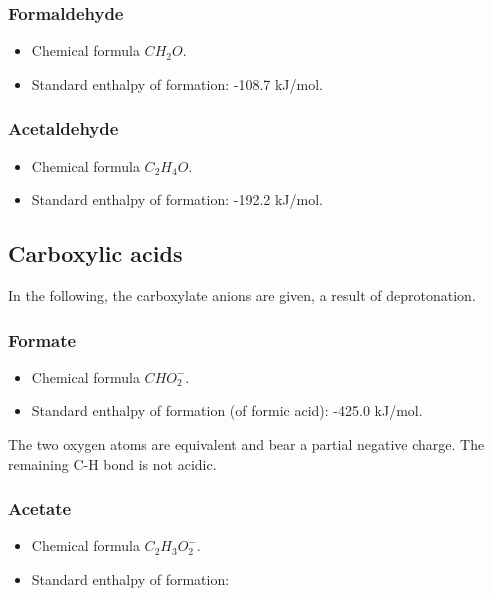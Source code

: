 \documentclass{article}
\begin{document}
\subsubsection{Formaldehyde}

\begin{itemize}
    \item Chemical formula $CH_2O$.
    \item Standard enthalpy of formation: -108.7 kJ/mol.
\end{itemize}

\subsubsection{Acetaldehyde}

\begin{itemize}
    \item Chemical formula $C_2H_4O$.
    \item Standard enthalpy of formation: -192.2 kJ/mol.
\end{itemize}

\subsection{Carboxylic acids}

In the following, the carboxylate anions are given, a result of deprotonation.

\subsubsection{Formate}
\begin{itemize}
    \item Chemical formula $CHO_2^-$.
    \item Standard enthalpy of formation (of formic acid): -425.0 kJ/mol.
\end{itemize}
The two oxygen atoms are equivalent and bear a partial negative charge. The remaining C-H
bond is not acidic.

\subsubsection{Acetate}
\begin{itemize}
    \item Chemical formula $C_2H_3O_2^-$.
    \item Standard enthalpy of formation:
\end{itemize}
\end{document}
